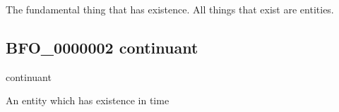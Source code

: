 \documentclass[letterpaper,10pt,english]{sphinxmanual}
\begin{document}
\begin{sphinxShadowBox}

\sphinxAtStartPar
The fundamental thing that has existence. All things that exist are entities.
\end{sphinxShadowBox}

\begin{sphinxShadowBox}

\sphinxAtStartPar
{}
\end{sphinxShadowBox}
\begin{quote}

\ignorespaces \end{quote}


\subsection{BFO\_0000002 \sphinxhyphen{} continuant}
\label{\detokenize{doc-BFO_0000002:bfo-0000002-continuant}}\label{\detokenize{doc-BFO_0000002:index-0}}\label{\detokenize{doc-BFO_0000002::doc}}
\begin{sphinxShadowBox}

\sphinxAtStartPar
continuant
\end{sphinxShadowBox}

\begin{sphinxShadowBox}

\sphinxAtStartPar
{\hyperref[\detokenize{doc-BFO_0000001::doc}]{}}
\end{sphinxShadowBox}

\begin{sphinxShadowBox}

\sphinxAtStartPar
An entity which has existence in time
\end{sphinxShadowBox}

\begin{sphinxShadowBox}

\sphinxAtStartPar
{}
\end{sphinxShadowBox}
\begin{quote}

\ignorespaces \end{quote}
\end{document}
